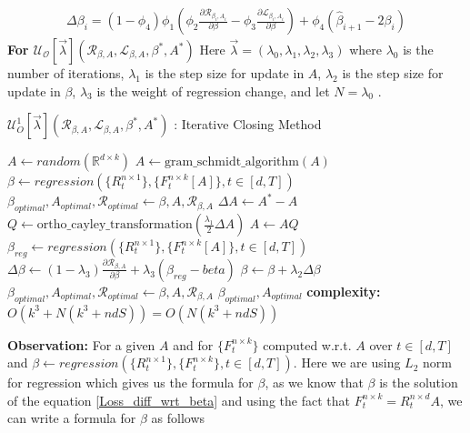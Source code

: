 \begin{equation}
\begin{aligned}
    \Delta \beta_{i} =  (1-\phi_4)\phi_1(\phi_2 \frac{\partial \mathcal{R}_{\beta_i, A_{i}}}{\partial \beta} - \phi_3 \frac{\partial \mathcal{L}_{\beta_i, A_{i}}}{\partial \beta} ) + \phi_4(\hat{\beta}_{i+1}-2\beta_{i})
\end{aligned}
\end{equation}
\hspace{2mm} \newline \textbf{For $\mathcal{U_{O}}[\vec{\lambda}](\mathcal{R}_{\beta, A},\mathcal{L}_{\beta, A},\beta^{*},A^{*})$}
\newline Here $\vec{\lambda} = (\lambda_0,\lambda_1,\lambda_2, \lambda_3)$ where $\lambda_0$ is the number of iterations, $\lambda_1$ is the step size for update in $A$, $\lambda_2$ is the step size for update in $\beta$, $\lambda_3$ is the weight of regression change, and let $N = \lambda_0$ .
\begin{algorithm}[H]
\caption{$\mathcal{U}^{1}_{O}[\vec{\lambda}](\mathcal{R}_{\beta, A},\mathcal{L}_{\beta, A},\beta^{*},A^{*})$ : Iterative Closing Method}\label{lfm_baseline_method}
\begin{algorithmic}[1]
\State $A \gets random(\mathbb{R}^{d\times k})$
\State $A \gets \text{gram\_schmidt\_algorithm}(A)$
\State $\beta \gets regression(\{R^{n\times 1}_{t}\},\{F^{n\times k}_{t}[A]\}, t\in [d,T])$
\State $\beta_{optimal}, A_{optimal}, \mathcal{R}_{optimal} \gets \beta, A, \mathcal{R}_{\beta, A}$
    \State $\Delta A \gets A^{*} - A$
    \State $Q \gets \text{ortho\_cayley\_transformation}(\frac{\lambda_1}{2} \Delta A)$
    \State $A \gets AQ$
    \State $\beta_{reg} \gets regression(\{R^{n\times 1}_{t}\},\{F^{n\times k}_{t}[A]\}, t\in [d,T])$
    \State $\Delta \beta \gets (1-\lambda_3)\frac{\partial \mathcal{R}_{\beta, A}}{\partial \beta} + \lambda_3 (\beta_{reg}-beta)$
    \State $\beta \gets \beta + \lambda_2 \Delta \beta$
      
        \State $\beta_{optimal}, A_{optimal}, \mathcal{R}_{optimal} \gets \beta, A, \mathcal{R}_{\beta, A} $
    \EndIf 
\EndFor
\State \Return  $\beta_{optimal}, A_{optimal}$
\State \textbf{complexity: } $O(k^3+N(k^3+ndS))=O(N(k^3+ndS))$
\end{algorithmic}
\end{algorithm} \newline \textbf{Observation:} For a given $A$ and for $\{F^{n\times k}_{t}\}$ computed w.r.t. $A$ over $t\in [d,T]$ and $\beta \gets regression(\{R^{n\times 1}_{t}\},\{F^{n\times k}_{t}\}, t\in [d,T])$. Here we are using $L_2$ norm for regression which gives us the formula for $\beta$, as we know that $\beta$ is the solution of the equation \ref{Loss_diff_wrt_beta} and using the fact that $F^{n\times k}_{t} = R^{n\times d}_{t}A$, we can write a formula for $\beta$ as follows
